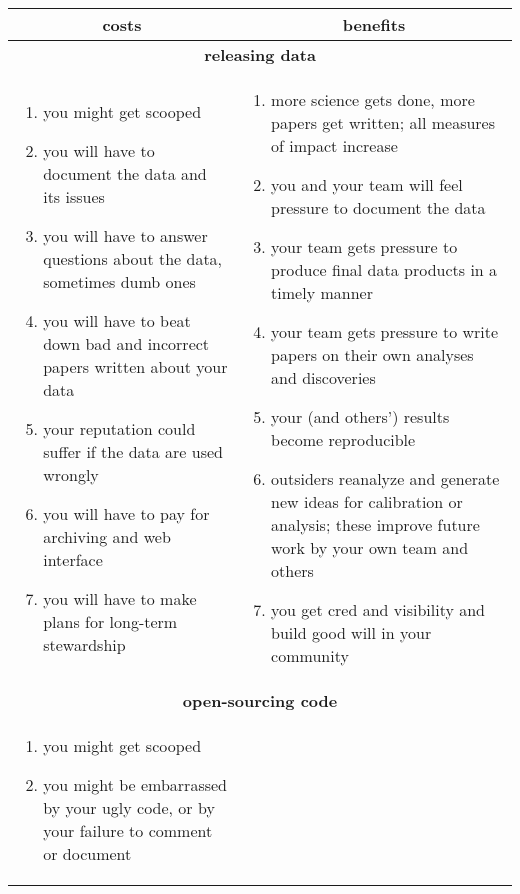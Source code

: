 \documentclass[12pt,twoside,pdftex]{article}
\begin{document}
\begin{table}
\begin{tabular}{@{}p{}|p{}@{}}%
\multicolumn{1}{c|}{costs} & \multicolumn{1}{c}{benefits} \\
\hline \multicolumn{2}{c}{\textbf{releasing data}} \\ \hline
\begin{enumerate}\raggedright
\item you might get scooped
\item you will have to document the data and its issues
\item you will have to answer questions about the data, sometimes dumb ones
\item you will have to beat down bad and incorrect papers written about your data
\item your reputation could suffer if the data are used wrongly
\item you will have to pay for archiving and web interface
\item you will have to make plans for long-term stewardship
\end{enumerate}&\begin{enumerate}\raggedright
\item more science gets done, more papers get written; all measures of impact increase
\item you and your team will feel pressure to document the data
\item your team gets pressure to produce final data products in a timely manner
\item your team gets pressure to write papers on their own analyses and discoveries
\item your (and others') results become reproducible
\item outsiders reanalyze and generate new ideas for calibration or analysis; these improve future work by your own team and others
\item you get cred and visibility and build good will in your community
\end{enumerate} \\
\hline \multicolumn{2}{c}{\textbf{open-sourcing code}} \\ \hline
\begin{enumerate}\raggedright
\item you might get scooped
\item you might be embarrassed by your ugly code, or by your failure to comment or document

\end{enumerate}
\end{tabular}
\end{table}
\end{document}
